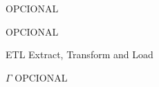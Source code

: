 \listoffigures*
OPCIONAL
\cleardoublepage

\listoftables*
OPCIONAL
\cleardoublepage

\begin{siglas}
  \item[ETL] Extract, Transform and Load
\end{siglas}

\begin{simbolos}
  \item[$ \Gamma $] OPCIONAL
\end{simbolos}
